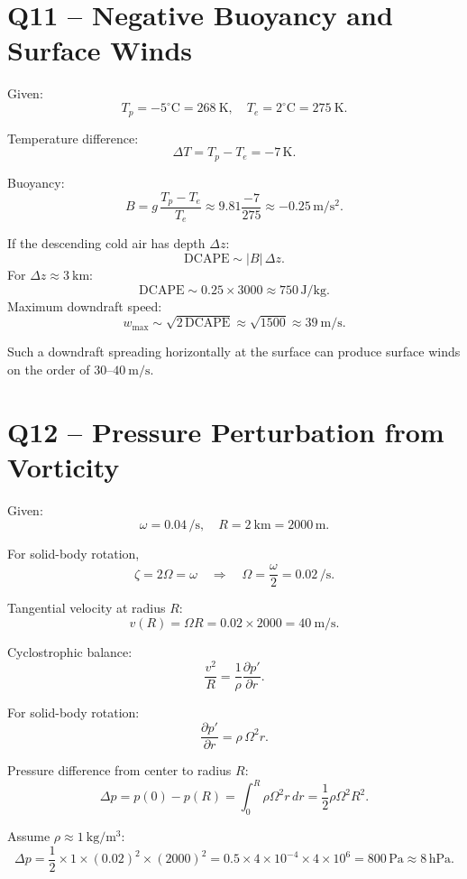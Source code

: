 \documentclass[12pt,a4paper]{article}
\begin{document}
\section*{Q11 -- Negative Buoyancy and Surface Winds}

Given:
\[
T_p = -5^\circ\text{C} = \SI{268}{\kelvin},\quad
T_e = 2^\circ\text{C} = \SI{275}{\kelvin}.
\]

Temperature difference:
\[
\Delta T = T_p - T_e = -7\,\si{\kelvin}.
\]

Buoyancy:
\[
B = g\,\frac{T_p - T_e}{T_e}
\approx 9.81 \frac{-7}{275}
\approx -0.25 \,\si{\meter\per\second\squared}.
\]

If the descending cold air has depth \(\Delta z\):
\[
\text{DCAPE} \sim |B|\,\Delta z.
\]
For \(\Delta z \approx \SI{3}{\kilo\meter}\):
\[
\text{DCAPE} \sim 0.25\times 3000
\approx 750 \,\si{\joule\per\kilo\gram}.
\]
Maximum downdraft speed:
\[
w_{\max} \sim \sqrt{2\,\text{DCAPE}}
\approx \sqrt{1500}
\approx \SI{39}{\meter\per\second}.
\]

Such a downdraft spreading horizontally at the surface can produce
surface winds on the order of \(30\text{--}\SI{40}{\meter\per\second}\).

\section*{Q12 -- Pressure Perturbation from Vorticity}

Given:
\[
\omega = 0.04 \,\si{\per\second},\quad
R = \SI{2}{\kilo\meter} = 2000\,\si{\meter}.
\]

For solid-body rotation,
\[
\zeta = 2\Omega = \omega
\quad\Rightarrow\quad
\Omega = \frac{\omega}{2} = 0.02 \,\si{\per\second}.
\]

Tangential velocity at radius \(R\):
\[
v(R) = \Omega R = 0.02 \times 2000
= \SI{40}{\meter\per\second}.
\]

Cyclostrophic balance:
\[
\frac{v^2}{R}
= \frac{1}{\rho}\frac{\partial p'}{\partial r}.
\]

For solid-body rotation:
\[
\frac{\partial p'}{\partial r}
= \rho\,\Omega^2 r.
\]

Pressure difference from center to radius \(R\):
\[
\Delta p = p(0) - p(R)
= \int_0^R \rho \Omega^2 r \, dr
= \frac{1}{2}\rho\Omega^2 R^2.
\]

Assume \(\rho \approx \SI{1}{\kilo\gram\per\meter^3}\):
\[
\Delta p = \frac{1}{2}\times 1 \times
(0.02)^2 \times (2000)^2
= 0.5 \times 4\times 10^{-4} \times 4\times 10^6
= 800\,\si{\pascal}
\approx 8\,\si{\hecto\pascal}.
\]
\end{document}

